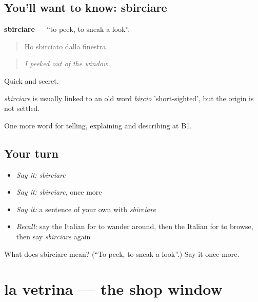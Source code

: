 \subsection*{You'll want to know: sbirciare}
\textbf{sbirciare} — \textquotedblleft{}to peek, to sneak a look\textquotedblright{}.

\begin{quote}
Ho sbirciato dalla finestra.
\end{quote}

\begin{quote}
\emph{I peeked out of the window.}
\end{quote}

Quick and secret.

\begin{cousinweb}
\emph{sbirciare} is usually linked to an old word \emph{bircio} 'short-sighted', but the origin is not settled.
\end{cousinweb}

\begin{grammarlens}[title={What you've built}]
One more word for telling, explaining and describing at B1.
\end{grammarlens}

\subsection*{Your turn}
\begin{itemize}
\raggedright
  \item \emph{Say it:} \emph{sbirciare}
  \item \emph{Say it:} \emph{sbirciare}, once more
  \item \emph{Say it:} a sentence of your own with \emph{sbirciare}
  \item \emph{Recall:} say the Italian for to wander around, then the Italian for to browse, then say \emph{sbirciare} again
\end{itemize}

\begin{tcolorbox}[breakable,colback=teal!4,colframe=teal!35!black,title={Before you move on}]
What does sbirciare mean? (\textquotedblleft{}To peek, to sneak a look\textquotedblright{}.) Say it once more.
\end{tcolorbox}
\section[la vetrina]{la vetrina — the shop window}

